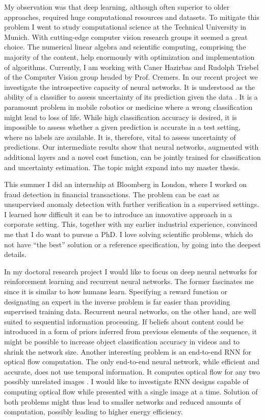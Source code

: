 \documentclass[12pt]{article}
\begin{document}
My observation was that deep learning, although often superior to older approaches, required huge computational resources and datasets. To mitigate this problem I went to study computational science at the Technical University in Munich. With cutting-edge computer vision research groups it seemed a great choice. The numerical linear algebra and scientific computing, comprising the majority of the content, help enormously with optimization and implementation of algorithms. Currently, I am working with Caner Hazirbas and Rudolph Triebel of the Computer Vision group headed by Prof. Cremers. In our recent project we investigate the introspective capacity of neural networks. It is understood as the ability of a classifier to assess uncertainty of its prediction given the data \cite{introspective}. It is a paramount problem in mobile robotics or medicine where a wrong classification might lead to loss of life. While high classification accuracy is desired, it is impossible to assess whether a given prediction is accurate in a test setting, where no labels are available. It is, therefore, vital to assess uncertainty of predictions. Our intermediate results show that neural networks, augmented with additional layers and a novel cost function, can be jointly trained for classification and uncertainty estimation. The topic might expand into my master thesis.

This summer I did an internship at Bloomberg in London, where I worked on fraud detection in financial transactions. The problem can be cast as unsupervised anomaly detection with further verification in a supervised settings. I learned how difficult it can be to introduce an innovative approach in a corporate setting. This, together with my earlier industrial experience, convinced me that I do want to pursue a PhD. I love solving scientific problems, which do not have ``the best'' solution or a reference specification, by going into the deepest details.

In my doctoral research project I would like to focus on deep neural networks for reinforcement learning and recurrent neural networks. The former fascinates me since it is similar to how humans learn. Specifying a reward function  or designating an expert in the inverse problem  is far easier than providing supervised training data. Recurrent neural networks, on the other hand, are well suited to sequential information processing. If beliefs about content could be introduced in a form of priors inferred from previous elements of the sequence, it might be possible to increase object classification accuracy in videos and to shrink the network size. Another interesting problem is an end-to-end RNN for optical flow computation. The only end-to-end neural network, while efficient and accurate, does not use temporal information. It computes optical flow for any two possibly unrelated images \cite{flownet}. I would like to investigate RNN designs capable of computing optical flow while presented with a single image at a time. Solution of both problems might thus lead to smaller networks and reduced amounts of computation, possibly leading to higher energy efficiency.
\end{document}

